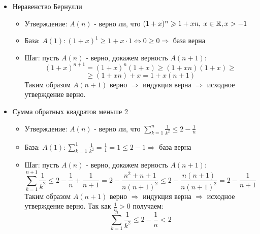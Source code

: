{\begin{itemize}
		\item Неравенство Бернулли
		\begin{itemize}
			\item Утверждение: $A(n)$ - верно ли, что $(1 + x)^n \geqslant 1 + xn, \: x \in \mathbb{R}, x > -1$
			\item База: $A(1) \colon (1 + x)^1 \geqslant 1 + x\cdot1 \Leftrightarrow 0 \geqslant 0 \Rightarrow$ база верна
			\item Шаг: пусть $A(n)$ - верно, докажем верность $A(n + 1)$:
			$$(1 + x)^{n + 1} = (1 + x)^n(1 + x) \geqslant (1 + xn)(1 + x)\geqslant$$$$ \geqslant (1 + xn) + x = 1 + x(n + 1)$$
			Таким образом $A(n + 1)$ верно $\Rightarrow$ индукция верна $\Rightarrow$ исходное утверждение верно.
		\end{itemize}
		\item Сумма обратных квадратов меньше 2
		\begin{itemize}
			\item Утверждение: $A(n)$ - верно ли, что $\displaystyle\sum_{k=1}^{n} \frac{1}{k^2} \leqslant 2 - \frac{1}{n}$
			\item База: $A(1)\colon \displaystyle\sum_{k=1}^{1}\frac{1}{k^2} = \frac{1}{1} = 1 \leqslant 2 - 1 \Rightarrow$ база верна
			\item Шаг: пусть $A(n)$ - верно, докажем верность $A(n + 1)$:
			$$\displaystyle\sum_{k=1}^{n+1} \frac{1}{k^2}  \leqslant 2 - \frac{1}{n} + \frac{1}{n+1} = 2 - \frac{n^2 + n + 1}{n(n + 1)^2} \leqslant 2 - \frac{n(n + 1)}{n(n+1)^2} = 2 - \frac{1}{n+1}$$
			Таким образом $A(n + 1)$ верно $\Rightarrow$ индукция верна $\Rightarrow$ исходное утверждение верно. Так как $\frac{1}{n} > 0$ получаем:
			$$\displaystyle\sum_{k=1}^{n} \frac{1}{k^2} \leqslant 2 - \frac{1}{n} < 2$$
		\end{itemize} 
	\end{itemize}
}